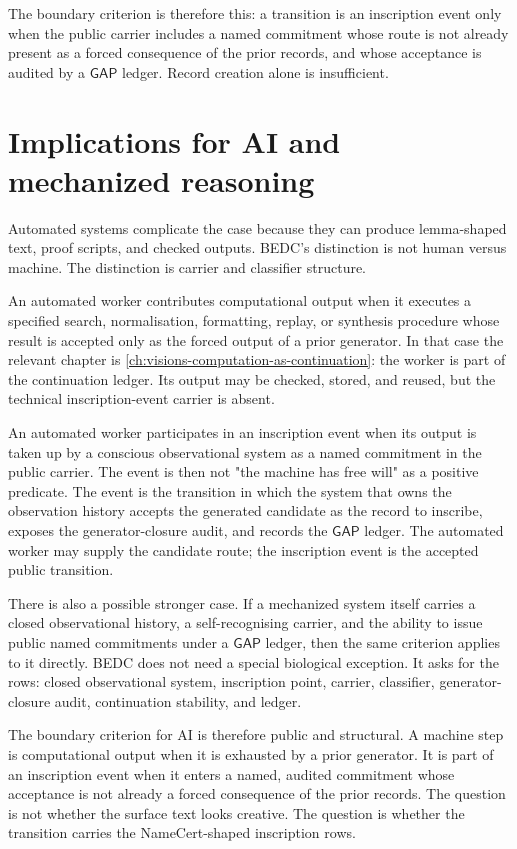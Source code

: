 The boundary criterion is therefore this: a transition is an inscription
event only when the public carrier includes a named commitment whose route is
not already present as a forced consequence of the prior records, and whose
acceptance is audited by a $\mathsf{GAP}$ ledger.  Record creation alone is
insufficient.

\section{Implications for AI and mechanized reasoning}
\label{sec:inscription-event-ai-mechanized-reasoning}

Automated systems complicate the case because they can produce lemma-shaped
text, proof scripts, and checked outputs.  BEDC's distinction is not human
versus machine.  The distinction is carrier and classifier structure.

An automated worker contributes computational output when it executes a
specified search, normalisation, formatting, replay, or synthesis procedure
whose result is accepted only as the forced output of a prior generator.  In
that case the relevant chapter is \autoref{ch:visions-computation-as-continuation}:
the worker is part of the continuation ledger.  Its output may be checked,
stored, and reused, but the technical inscription-event carrier is absent.

An automated worker participates in an inscription event when its output is
taken up by a conscious observational system as a named commitment in the
public carrier.  The event is then not "the machine has free will" as a
positive predicate.  The event is the transition in which the system that
owns the observation history accepts the generated candidate as the record to
inscribe, exposes the generator-closure audit, and records the
$\mathsf{GAP}$ ledger.  The automated worker may supply the candidate route;
the inscription event is the accepted public transition.

There is also a possible stronger case.  If a mechanized system itself
carries a closed observational history, a self-recognising carrier, and the
ability to issue public named commitments under a $\mathsf{GAP}$ ledger, then
the same criterion applies to it directly.  BEDC does not need a special
biological exception.  It asks for the rows: closed observational system,
inscription point, carrier, classifier, generator-closure audit, continuation
stability, and ledger.

The boundary criterion for AI is therefore public and structural.  A machine
step is computational output when it is exhausted by a prior generator.  It
is part of an inscription event when it enters a named, audited commitment
whose acceptance is not already a forced consequence of the prior records.
The question is not whether the surface text looks creative.  The question is
whether the transition carries the NameCert-shaped inscription rows.

